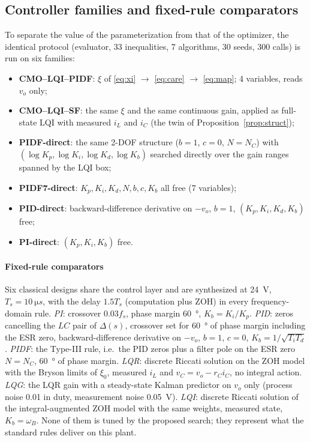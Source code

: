 \subsection{Controller families and fixed-rule comparators}\label{sec:families}
To separate the value of the parameterization from that of the optimizer, the
identical protocol (evaluator, 33 inequalities, 7 algorithms, 30 seeds,
300 calls) is run on six families:
\begin{itemize}
\item \textbf{CMO--LQI--PIDF}: $\xi$ of \eqref{eq:xi} $\to$ \eqref{eq:care}
  $\to$ \eqref{eq:map}; 4 variables, reads $v_o$ only;
\item \textbf{CMO--LQI--SF}: the same $\xi$ and the same continuous gain, applied
  as full-state LQI with measured $i_L$ and $i_C$ (the twin of
  Proposition~\ref{prop:struct});
\item \textbf{PIDF-direct}: the same 2-DOF structure ($b=1$, $c=0$, $N=N_C$) with
  $(\log K_p,\log K_i,\log K_d,\log K_b)$ searched directly over the gain ranges
  spanned by the LQI box;
\item \textbf{PIDF7-direct}: $K_p,K_i,K_d,N,b,c,K_b$ all free (7 variables);
\item \textbf{PID-direct}: backward-difference derivative on $-v_o$, $b=1$,
  $(K_p,K_i,K_d,K_b)$ free;
\item \textbf{PI-direct}: $(K_p,K_i,K_b)$ free.
\end{itemize}

\paragraph{Fixed-rule comparators}\label{sec:comparators}
Six classical designs share the control layer and are synthesized at \SI{24}{V},
$T_s=\SI{10}{\micro s}$, with the delay $1.5T_s$ (computation plus ZOH) in every
frequency-domain rule. \emph{PI}: crossover $0.03f_s$, phase margin
\SI{60}{\degree}, $K_b=K_i/K_p$. \emph{PID}: zeros cancelling the $LC$ pair of
$\Delta(s)$, crossover set for \SI{60}{\degree} of phase margin including the ESR
zero, backward-difference derivative on $-v_o$, $b=1$, $c=0$,
$K_b=1/\sqrt{T_iT_d}$. \emph{PIDF}: the Type-III rule, i.e.\ the PID zeros plus a
filter pole on the ESR zero $N=N_C$, \SI{60}{\degree} of phase margin.
\emph{LQR}: discrete Riccati solution on the ZOH model with the Bryson limits of
$\xi_0$, measured $i_L$ and $v_C=v_o-r_Ci_C$, no integral action. \emph{LQG}: the
LQR gain with a steady-state Kalman predictor on $v_o$ only (process noise
0.01 in duty, measurement noise \SI{0.05}{V}). \emph{LQI}: discrete Riccati
solution of the integral-augmented ZOH model with the same weights, measured
state, $K_b=\omega_B$. None of them is tuned by the proposed search; they
represent what the standard rules deliver on this plant.

